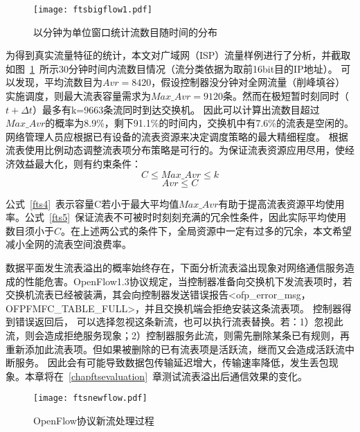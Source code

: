 \begin{figure}[!ht]
	\vspace{-1.5mm}
	\centering 
	\texttt{[image: ftsbigflow1.pdf]}
	\caption{以分钟为单位窗口统计流数目随时间的分布} \label{fig:ftsbigflow}
\end{figure}

为得到真实流量特征的统计，本文对广域网（ISP）流量样例进行了分析，并截取如图~\ref{fig:ftsbigflow}~所示30分钟时间内流数目情况（流分类依据为取前16bit目的IP地址）。
可以发现，平均流数目为$Avr=8420$，假设控制器没分钟对全网流量（削峰填谷）实施调度，则最大流表容量需求为$Max\_Avr=9120$条。然而在极短暂时刻同时（$t+\Delta t$）最多有k=9663条流同时到达交换机。
因此可以计算出流数目超过$Max\_Avr$的概率为8.9\%，剩下91.1\%的时间内，交换机中有7.6\%的流表是空闲的。
网络管理人员应根据已有设备的流表资源来决定调度策略的最大精细程度。
根据流表使用比例动态调整流表项分布策略是可行的。为保证流表资源应用尽用，使经济效益最大化，则有约束条件：
\begin{equation}\label{fts4}
C \leq Max\_Avr \leq k 
\end{equation}
\begin{equation}\label{fts5}
Avr \leq C 
\end{equation}

公式~\ref{fts4}~表示容量C若小于最大平均值$Max\_Avr$有助于提高流表资源平均使用率。公式~\ref{fts5}~保证流表不可被时时刻刻充满的冗余性条件，因此实际平均使用数目须小于$C$。在上述两公式的条件下，全局资源中一定有过多的冗余，本文希望减小全网的流表空间浪费率。

数据平面发生流表溢出的概率始终存在，下面分析流表溢出现象对网络通信服务造成的性能危害。OpenFlow1.3协议规定，当控制器准备向交换机下发流表项时，若交换机流表已经被装满，其会向控制器发送错误报告<ofp\_error\_msg，OFPFMFC\_TABLE\_FULL>，并且交换机端会拒绝安装这条流表项。
控制器得到错误返回后， 可以选择忽视这条新流，也可以执行流表替换。若：1）忽视此流，则会造成拒绝服务现象；2）控制器服务此流，则需先删除某条已有规则，再重新添加此流表项。但如果被删除的已有流表项是活跃流，继而又会造成活跃流中断服务。
因此会有可能导致数据包传输延迟增大，传输速率降低，发生丢包现象。本章将在~\ref{chapftsevaluation}~章测试流表溢出后通信效果的变化。



\begin{figure}[!ht]
	\centering 
	\vspace{-1.5mm} 
	\texttt{[image: ftsnewflow.pdf]}
	\caption{OpenFlow协议新流处理过程} \label{fig:ftsnewflow}
\end{figure}

